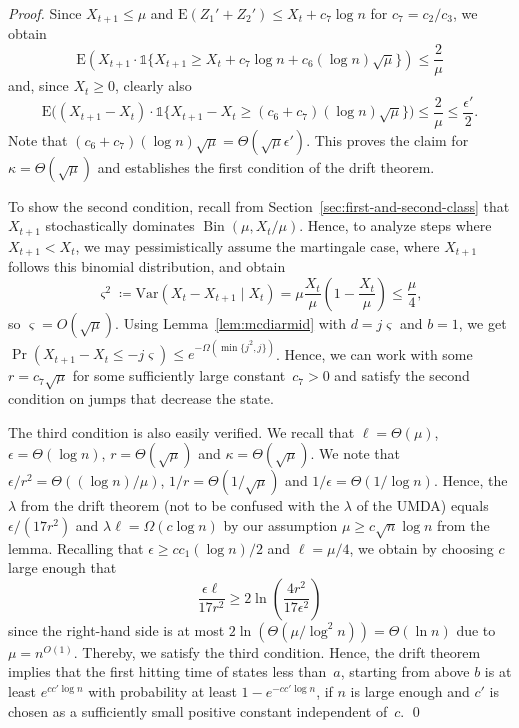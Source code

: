 \documentclass[11pt, a4paper]{article}
\DeclareMathOperator{\Prob}{Pr}
\newcommand*{\E}{\mathrm{E}}
\newcommand*{\Var}{\mathrm{Var}}
\newcommand{\indic}[1]{\mathds{1}\{#1\}}
\DeclareMathOperator{\Bin}{Bin}
\begin{document}
\begin{proof}
Since $X_{t+1}\le \mu$ and  $\E(Z_1'+Z_2')\le X_t+c_7\log n$ for $c_7=c_2/c_3$, we obtain   
\[
\E(X_{t+1} \cdot \indic{X_{t+1}\ge X_t + c_7\log n  +c_6(\log n)\sqrt{\mu}} ) \le \frac{2}{\mu}
\]
and, since $X_t\ge 0$, clearly also 
\[
\E\bigl((X_{t+1}-X_t) \cdot \indic{X_{t+1}-X_t \ge  (c_6+c_7)(\log n)\sqrt{\mu}}\bigr ) \le \frac{2}{\mu} \le \frac{\epsilon'}{2}.
\]
Note that $(c_6+c_7)(\log n)\sqrt{\mu}=\Theta(\sqrt{\mu}\epsilon')$. 
This proves the claim for $\kappa=\Theta(\sqrt{\mu})$ and establishes the 
first condition of the drift theorem.

To show the second condition, recall from 
 Section~\ref{sec:first-and-second-class} that $X_{t+1}$ stochastically dominates $\Bin(\mu,X_t/\mu)$. Hence, to analyze steps 
where $X_{t+1}<X_t$, we may pessimistically assume the martingale case, where  $X_{t+1}$ follows this binomial distribution, and obtain  
\[\varsigma^2\coloneqq \Var(X_{t}-X_{t+1}\mid X_t)=\mu\frac{X_t}{\mu}\left(1-\frac{X_t}{\mu}\right)\le \frac{\mu}{4},\]
so $\varsigma=O(\sqrt{\mu})$. 
Using Lemma~\ref{lem:mcdiarmid} with $d=j\varsigma$ and $b=1$, we get 
$\Prob(X_{t+1}-X_t \le -j\varsigma) \le e^{-\Omega(\min\{j^2,j\})}$. Hence, we can work with some $r=c_7\sqrt{\mu} $ 
for some sufficiently large constant~$c_7>0$ and satisfy the second condition on jumps that decrease the state. 

The third condition is 
also easily verified.
We recall that $\ell=\Theta(\mu)$, $\epsilon=\Theta(\log n)$, $r=\Theta(\sqrt{\mu})$ and $\kappa=\Theta(\sqrt{\mu})$. 
We note that $\epsilon/r^2=\Theta((\log n)/\mu)$, $1/r=\Theta(1/\sqrt{\mu})$ and 
$1/\epsilon=\Theta(1/\!\log n)$. Hence, the $\lambda$ from the drift theorem (not to be confused 
with the $\lambda$ of the UMDA) equals 
$\epsilon/(17r^2)$ and $\lambda\ell  =  \Omega(c\log n)$ by 
our assumption $\mu\ge c\sqrt{n}\log n$ 
from the lemma. Recalling that $\epsilon\ge c c_1(\log n)/2$ and  $\ell=\mu/4$, we obtain 
by choosing $c$ large enough that 
\[
\frac{\epsilon \ell}{17r^2} \ge 2\ln\left(\frac{4r^2}{17\epsilon^2} \right )
\]
since the right-hand side is at most $2\ln(\Theta(\mu/\!\log^2 n)) = \Theta(\ln n)$ due to $\mu = n^{O(1)}$. Thereby, we satisfy the third condition. 
Hence, the drift theorem implies that the first hitting time of states less than~$a$, starting 
from above $b$ is at least $e^{cc'\log n}$ with probability at least $1-e^{-cc'\log n}$, if $n$ is large enough and $c'$ 
is chosen as a sufficiently small positive constant independent of~$c$. 
\qed\end{proof}
\end{document}
